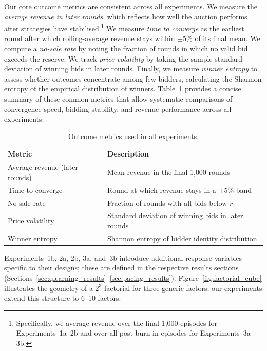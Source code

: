Our core outcome metrics are consistent across all experiments. We measure the \emph{average revenue in later rounds}, which reflects how well the auction performs after strategies have stabilised.\footnote{Specifically, we average revenue over the final 1{,}000 episodes for Experiments~1a--2b and over all post-burn-in episodes for Experiments~3a--3b.} We measure \emph{time to converge} as the earliest round after which rolling-average revenue stays within $\pm 5\%$ of its final mean. We compute a \emph{no-sale rate} by noting the fraction of rounds in which no valid bid exceeds the reserve. We track \emph{price volatility} by taking the sample standard deviation of winning bids in later rounds. Finally, we measure \emph{winner entropy} to assess whether outcomes concentrate among few bidders, calculating the Shannon entropy of the empirical distribution of winners. Table~\ref{tab:outcomes} provides a concise summary of these common metrics that allow systematic comparisons of convergence speed, bidding stability, and revenue performance across all experiments.

\begin{table}[h]
\centering
\caption{Outcome metrics used in all experiments.}
\label{tab:outcomes}
\begin{tabular}{l l}
\toprule
\textbf{Metric} & \textbf{Description}\\
\midrule
Average revenue (later rounds) & Mean revenue in the final 1{,}000 rounds \\
Time to converge & Round at which revenue stays in a $\pm 5\%$ band \\
No-sale rate & Fraction of rounds with all bids below $r$\\
Price volatility & Standard deviation of winning bids in later rounds \\
Winner entropy & Shannon entropy of bidder identity distribution \\
\bottomrule
\end{tabular}
\end{table}

Experiments~1b, 2a, 2b, 3a, and~3b introduce additional response variables specific to their designs; these are defined in the respective results sections (Sections~\ref{sec:qlearning_results}--\ref{sec:pacing_results}). Figure~\ref{fig:factorial_cube} illustrates the geometry of a $2^3$ factorial for three generic factors; our experiments extend this structure to 6--10 factors.

